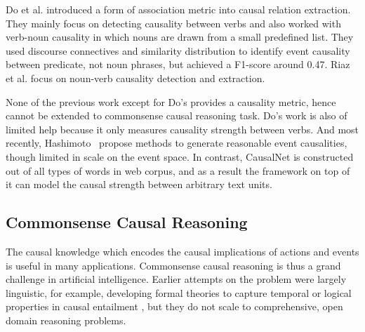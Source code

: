 \documentclass[letterpaper]{article}
\newcommand{\cut}[1]{}
\begin{document}
Do et al. \cite{do2011minimally} introduced a form of association
metric into causal relation extraction. They mainly focus on
detecting causality between verbs and also worked with verb-noun
causality in which nouns are drawn from a small predefined list.
They used discourse connectives and similarity distribution to
identify event causality between predicate, not noun phrases, but
achieved a F1-score around 0.47. Riaz et al.
\cite{riaz2014recognizing} focus on noun-verb causality detection
and extraction.

None of the previous work except for Do's provides a
causality metric, hence cannot be extended to commonsense causal
reasoning task. Do's work is also of limited help because it only
measures causality strength between verbs.
And most recently, Hashimoto~\cite{hashimoto2015generating} propose
methods to generate reasonable event causalities,
though limited in scale on the event space.  In contrast, CausalNet is
constructed out of all types of words in web corpus, and as a result
the framework on top of it can model the causal strength between
arbitrary text units.
\cut{
Much of the work ignored how the text spans surrounding the causal cue
affects the semantics. Our causal relation extraction
step, instead,  benefits from these contexts and
constructs a much larger and more powerful causal network.
Moreover, previous work
extracted specific types of causal pair, of either noun-noun, verb-verb or verb-noun
\cite{do2011minimally,riaz2014recognizing}
causality. None of the previous work except for
Do's~\shortcite{do2011minimally}
provides a numerical metric to measure causal strength,
hence cannot be extended to causal reasoning between short texts.
Do's work is also of limited help because it only
measures causal strength between verbs.
Recently, researchers \cite{hashimoto2015generating} also propose methods to
generate reasonable event causalities, though limited in scale.
Our CausalNet contains causal strength between arbitrary texts,
by using general web corpus and
extracting nouns, verbs, adjectives and
adverbs.}

\subsection{Commonsense Causal Reasoning}
The causal knowledge which encodes the causal implications of
actions and events is useful in many applications.
Commonsense causal reasoning is thus a
grand challenge in artificial intelligence. Earlier attempts on the
problem were largely linguistic, for example, developing formal
theories to capture temporal or logical properties in causal
entailment \cite{LascaridesAO92,lascarides:asher:1993a}, but
they do not scale to %
comprehensive, open domain reasoning problems.
\end{document}

